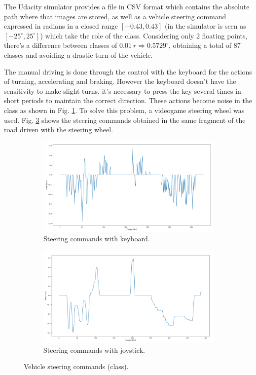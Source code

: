 \documentclass[conference]{IEEEtran}
\begin{document}
The Udacity simulator provides a file in CSV format which contains the absolute path where that images are stored, as well as a vehicle steering command expressed in radians in a closed range $[-0.43, 0.43]$ (in the simulator is seen as $[-25^\circ, 25^\circ]$) which take the role of the class. Considering only 2 floating points, there's a difference between classes of $0.01\ r \Rightarrow 0.5729^\circ$, obtaining a total of 87 classes and avoiding a drastic turn of the vehicle.

The manual driving is done through the control with the keyboard for the actions of turning, accelerating and braking. However the keyboard doesn't have the sensitivity to make slight turns, it's necessary to press the key several times in short periods to maintain the correct direction. These actions become noise in the class as shown in Fig. \ref{subfig:key}. To solve this problem, a videogame steering wheel was used. Fig. \ref{subfig:joy} shows the steering commands obtained in the same fragment of the road driven with the steering wheel.

\begin{figure}[h]
	\centering
	\begin{subfigure}{0.4\textwidth} 
		\includegraphics[width=\textwidth]{img/keyboard}
		\caption{Steering commands with keyboard.} 
		\label{subfig:key}
	\end{subfigure}
	\begin{subfigure}{0.4\textwidth} 
		\includegraphics[width=\textwidth]{img/joystick}
		\caption{Steering commands with joystick.} 
		\label{subfig:joy}
	\end{subfigure}
	\caption{Vehicle steering commands (class).} 
\end{figure}
\end{document}
